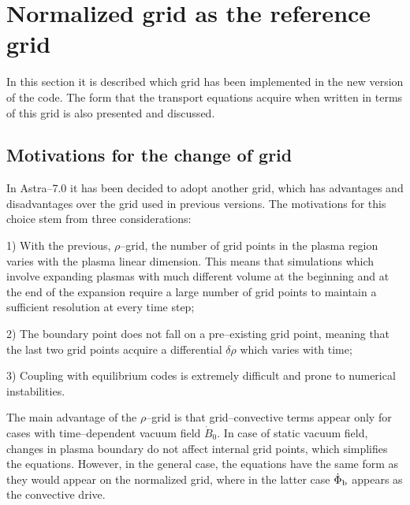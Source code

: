 \section{Normalized grid as the reference grid}
In this section it is described which grid has been implemented in the new
version of the code. The form that the transport equations acquire when
written in terms of this grid is also presented and discussed. 
%
\subsection{Motivations for the change of grid}
In Astra--7.0 it has been decided to adopt another grid, which has
advantages and disadvantages over the grid used in previous versions.
The motivations for this choice stem from three considerations:

1) With the previous, $\rho$--grid, the number of grid points in the plasma region
varies with the plasma linear dimension. This means that simulations which
involve expanding plasmas with much different volume at the beginning and at the
end of the expansion require a large number of grid points to maintain a sufficient
resolution at every time step;

2) The boundary point does not fall on a pre--existing grid point,
meaning that the last two grid points acquire a differential $\delta\rho$ which varies with time;

3) Coupling with equilibrium codes is extremely difficult and prone to numerical instabilities.

The main advantage of the $\rho$--grid is that grid--convective terms appear 
only for cases with 
time--dependent vacuum field $\dot{B}_0$. In case of static vacuum field, 
changes in plasma boundary do not affect internal grid points, which 
simplifies the equations. However, in the general case, the equations have the
same form as they would appear on the normalized grid, where in the latter case $\dot{\Phi}_{\rm b}$ appears as the convective drive.
%
